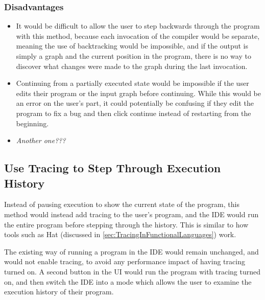 \documentclass[authoryearcitations]{UoYCSproject}
\begin{document}

\subsubsection{Disadvantages}
\label{sec:ProposedDesign1Disadvantages}

\begin{itemize}
    \item It would be difficult to allow the user to step backwards through the
          program with this method, because each invocation of the compiler
          would be separate, meaning the use of backtracking would be impossible,
          and if the output is simply a graph and the current position in the
          program, there is no way to discover what changes were made to the graph
          during the last invocation.

    \item Continuing from a partially executed state would be impossible if the
          user edits their program or the input graph before continuing. While
          this would be an error on the user's part, it could potentially be
          confusing if they edit the program to fix a bug and then click continue
          instead of restarting from the beginning.

    \item \emph{Another one???}
\end{itemize}


\subsection{Use Tracing to Step Through Execution History}
\label{sec:ProposedDesign2}

Instead of pausing execution to show the current state of the program, this
method would instead add tracing to the user's program, and the IDE would run
the entire program before stepping through the history. This is similar to how
tools such as Hat (discussed in \autoref{sec:TracingInFunctionalLanguages}) work.

The existing way of running a program in the IDE would remain unchanged, and
would not enable tracing, to avoid any performance impact of having tracing
turned on. A second button in the UI would run the program with tracing turned
on, and then switch the IDE into a mode which allows the user to examine the
execution history of their program.
\end{document}
